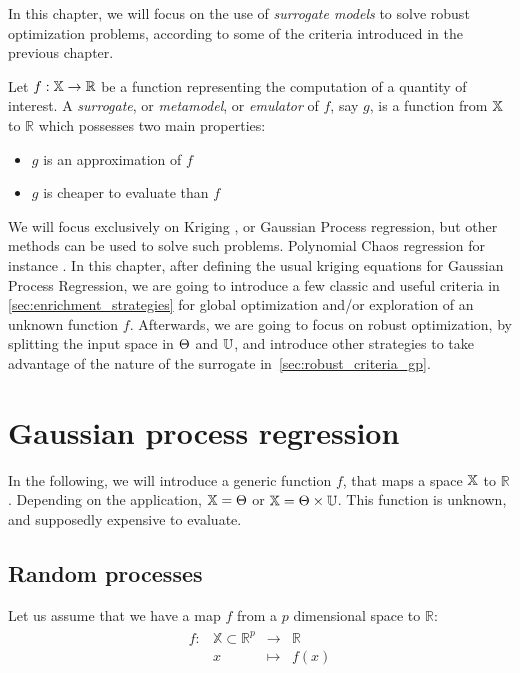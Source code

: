\documentclass[../../Main_ManuscritThese.tex]{subfiles}
\begin{document}
 In this chapter, we will focus on the use of \emph{surrogate models} to solve robust optimization problems, according to some of the criteria introduced in the previous chapter.
\begin{definition}
  Let $f: \mathbb{X} \rightarrow \mathbb{R}$ be a function representing the computation of a quantity of interest. A \emph{surrogate}, or \emph{metamodel}, or \emph{emulator} of $f$, say $g$, is a function from $\mathbb{X}$ to $\mathbb{R}$ which possesses two main properties:
  \begin{itemize}
  \item $g$ is an approximation of $f$
  \item $g$ is cheaper to evaluate than $f$ 
  \end{itemize}
\end{definition}
We will focus exclusively on Kriging \cite{krige_statistical_1951,matheron_traite_1962}, or Gaussian Process regression, but other methods can be used to solve such problems. Polynomial Chaos regression for instance \cite{wiener_homogeneous_1938,xiu_wiener--askey_2002,sudret_polynomial_2015,miranda_adjoint-based_2016}.
In this chapter, after defining the usual kriging equations for Gaussian Process Regression, we are going to introduce a few classic and useful criteria in \cref{sec:enrichment_strategies} for global optimization and/or exploration of an unknown function $f$. Afterwards, we are going to focus on robust optimization, by splitting the input space in $\Theta$ and $\mathbb{U}$, and introduce other strategies to take advantage of the nature of the surrogate in~\cref{sec:robust_criteria_gp}.

\section{Gaussian process regression}
In the following, we will introduce a generic function $f$, that maps a space $\mathbb{X}$ to $\mathbb{R}$. Depending on the application, $\mathbb{X} = \Theta$ or $\mathbb{X} = \Theta \times \mathbb{U}$. This function is unknown, and supposedly expensive to evaluate.

\subsection{Random processes}
Let us assume that we have a map $f$ from a $p$ dimensional space to $\mathbb{R}$:
\begin{align}
  \begin{array}{rrcl}
    f: & \mathbb{X} \subset \mathbb{R}^p& \longrightarrow & \mathbb{R} \\
       & x & \longmapsto & f(x)
  \end{array}
\end{align}
\end{document}
